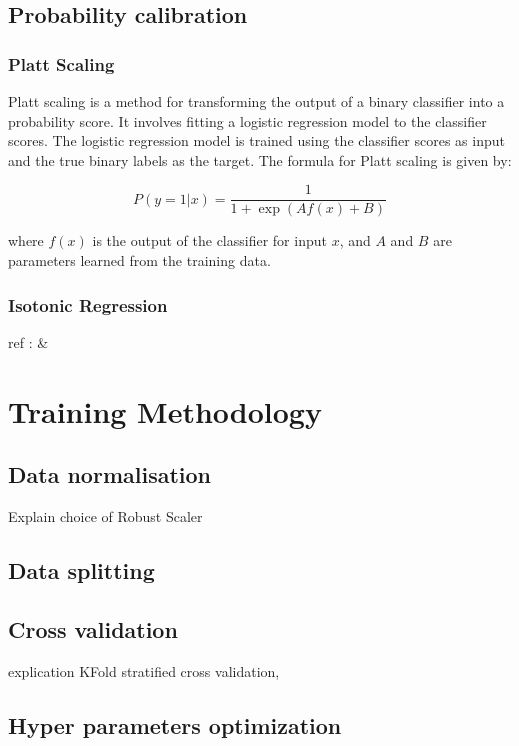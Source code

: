 \documentclass[12pt]{article}
\begin{document}
\newpage
\subsection{Probability calibration}

\subsubsection{Platt Scaling}\label{Platt scaling}
 
Platt scaling is a method for transforming the output of a binary classifier into a probability score. It involves fitting a logistic regression model to the classifier scores. The logistic regression model is trained using the classifier scores as input and the true binary labels as the target. The formula for Platt scaling is given by:
 
\begin{equation}
P(y=1|x) = \frac{1}{1 + \exp(Af(x) + B)}    
\end{equation}

 
where \( f(x) \) is the output of the classifier for input \( x \), and \( A \) and \( B \) are parameters learned from the training data.
 
\subsubsection{Isotonic Regression}\label{Isotonic regression}



ref : \cite{JasonBrownlee} \& \cite{ExperianLatAmDataLab}


\newpage
\section{Training Methodology}
\subsection{Data normalisation}
Explain choice of Robust Scaler
\subsection{Data splitting}
\subsection{Cross validation}
explication KFold stratified cross validation, 

\subsection{Hyper parameters optimization}
\end{document}
